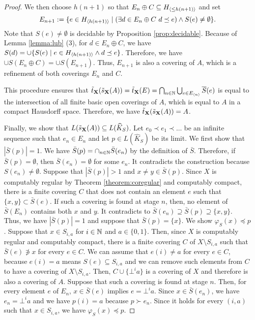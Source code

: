 \documentclass{eptcs-modified}
\begin{document}
\begin{proposition}
\begin{proof}
We then choose $h(n+1)$ so that $E_n \oplus C \subseteq {{H_{{\langle\leq h(n+1)\rangle}}}}$ and set
\[
E_{n+1} := \{e \in {{H_{{\langle h(n+1)\rangle}}}} \mid (\exists d \in E_n \oplus C \ d \preceq e) \land S(e) \ne \emptyset\}.
  \]
Note that $S(e) \ne \emptyset$ is decidable  by Proposition \ref{prop:decidable}.
Because of Lemma \ref{lemma:lub} (3), for $d \in E_n \oplus C$,
we have $S(d) = \cup\{S(e) \mid e \in {{H_{{\langle h(n+1)\rangle}}}} \land d \preceq e\}$.
Therefore,
we have $\cup S(E_n \oplus C) = \cup S(E_{n+1})$.
Thus, $E_{n+1}$ is also
a covering of $A$, which is a refinement of both coverings $E_n$ and $C$.

This procedure ensures that
$\tilde{t}_{\mathbf{X}}(\tilde{s}_{\mathbf{X}}(A)) =
\tilde{t}_{\mathbf{X}}(E) = \bigcap_{n \in \mathbb{N}} \bigcup_{e \in {{E_{{\langle n\rangle}}}}} \overline{S}(e)$
is equal to the intersection of all finite basic open coverings of $A$, which is equal to $A$ in a compact Hausdorff space.  Therefore, we have $\tilde{t}_{\mathbf{X}}(\tilde{s}_{\mathbf{X}}(A)) = A$.




Finally, we show that $L(\tilde{s}_{\mathbf{X}}(A)) \subseteq L(\widehat{K}_S)$.
Let $e_0 \prec e_1 \prec \ldots$ be an infinite sequence such that
$e_n \in E_n$ and let $p \in L(\widehat{K}_S)$ be its limit.
We first show that $|\bar{S}(p)| = 1$.
We have $\bar{S}(p) = \cap_{n \in \mathbb{N}} \bar{S}(e_n)$ by the definition of $\bar{S}$.  Therefore, if $\bar{S}(p) = \emptyset$, then $\bar{S}(e_n) = \emptyset$ for some $e_n$.   It contradicts the construction because $S(e_n) \ne \emptyset$.   Suppose that $|\bar{S}(p)| > 1$ and $x \ne y \in \bar{S}(p)$.
Since $X$ is computably regular by Theorem \ref{theorem:coregular} and computably compact,
there is a finite covering $C$ that does not contain an element $e$ such that $\{x, y\} \subset  \bar{S}(e)$.
If such a covering is found at stage $n$,  then,  no element of $\bar{S}(E_n)$ contains both $x$ and $y$.
It contradicts to $\bar{S}(e_n) \supseteq \bar{S}(p) \supseteq \{x, y\}$.  Thus, we have
$|\bar{S}(p)| = 1$ and suppose that $\bar{S}(p) = \{x\}$.  We show $\varphi_S(x) \preceq p$.
Suppose that  $x \in S_{i, a}$ for $i \in \mathbb{N}$ and $a \in \{0, 1\}$. Then,
since $X$ is computably regular and computably compact, there is a finite covering $C$ of $X \setminus S_{i, a}$ such that $\bar{S}(e) \not \ni x$ for every $e \in C$.
We can assume that $e(i) \ne a$ for every $e \in C$, because
$e(i) = a$ means $S(e) \subseteq S_{i, a}$ and  we can remove such elements from $C$ to have a covering of
$X \setminus S_{i, a}$.
Then, $C \cup \{\bot^i a\}$ is a covering of $X$ and therefore is also a covering of $A$.
Suppose that such a covering is found at stage $n$.  Then, for every element $e$ of $E_n$,
$x \in \bar{S}(e)$ implies $e = \bot^ia$.  Since $x \in \bar{S}(e_n)$, we have $e_n = \bot^i a$ and
we have $p(i) = a$ because $p \succ e_n$.
Since it holds for every $(i, a)$ such that $x \in S_{i, a}$, we have $\varphi_S(x) \preceq p$.
\end{proof}
\end{proposition}
\end{document}
